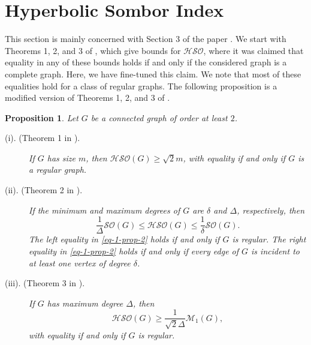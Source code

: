 \documentclass[12pt,a4paper]{article}
\newtheorem{proposition}{Proposition}[section]
\begin{document}
\section{Hyperbolic Sombor Index}


This section is mainly concerned with Section 3 of the paper \cite{Barman-MATCH-26}. We start with Theorems 1, 2, and 3 of \cite{Barman-MATCH-26}, which give bounds for $\mathcal{HSO}$, where it was claimed that equality in any of these bounds holds if and only if the considered graph is a complete graph. Here, we have fine-tuned this claim. We note that most of these equalities hold for a class of regular graphs. The following proposition is a modified version of Theorems 1, 2, and 3 of \cite{Barman-MATCH-26}.


\begin{proposition}\label{prop-1}
Let $G$ be a connected graph of order at least $2$.
\begin{description}
    \item[(i). (Theorem 1 in \cite{Barman-MATCH-26}).] If $G$ has size $m$, then
$\mathcal{HSO}(G)\ge  \sqrt{2}m$,
with equality if and only if $G$ is a regular graph.

    \item[(ii). (Theorem 2 in \cite{Barman-MATCH-26}).] If the minimum and maximum degrees of $G$ are  $\delta$ and  $\Delta$, respectively, then
\begin{equation}\label{eq-1-prop-2}
\frac{1}{\Delta}\mathcal{SO}(G)\le  \mathcal{HSO}(G) \le \frac{1}{\delta}\mathcal{SO}(G).
\end{equation}
The left equality in \eqref{eq-1-prop-2} holds if and only if $G$ is regular. The right equality in \eqref{eq-1-prop-2} holds if and only if every edge of $G$ is incident to at least one vertex of degree $\delta$.

    \item[(iii). (Theorem 3 in \cite{Barman-MATCH-26}).]
If $G$ has maximum degree $\Delta$, then
\begin{equation*}
\mathcal{HSO}(G) \ge \frac{1}{\sqrt{2}\Delta}\mathcal{M}_1(G),
\end{equation*}
with equality if and only if $G$ is regular.

\end{description}

\end{proposition}
\end{document}
